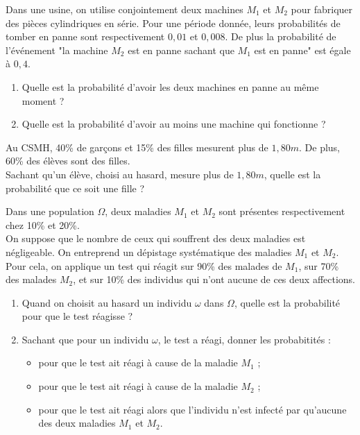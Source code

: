 \documentclass[11pt]{article}
\begin{document}
\begin{exercice}
Dans une usine, on utilise conjointement deux machines $M_1$ et $M_2$ pour
fabriquer des pièces cylindriques en série. Pour une période donnée,
leurs probabilités de tomber en panne sont respectivement $0,01$ et
$0,008$. De plus la probabilité de l’événement "la machine $M_2$ est en
panne sachant que $M_1$ est en panne" est égale à $0,4$.
\begin{enumerate}
\item Quelle est la probabilité d’avoir les deux machines en panne
  au même moment ? 
\item Quelle est la probabilité d’avoir au moins
  une machine qui fonctionne ?
\end{enumerate}
\end{exercice}

\begin{exercice}
Au CSMH, 40\% de garçons et 15\% des filles mesurent plus de
$1,80m$. De plus, 60\% des élèves sont des filles. \\
Sachant qu’un élève, choisi au hasard, mesure plus de $1,80m$, quelle
est la probabilité que ce soit une fille ? 
\end{exercice}

\begin{exercice}
Dans une population $\Omega$, deux maladies $M_1$ et $M_2$ sont
présentes respectivement chez 10\% et 20\%. \\
On suppose que le nombre de ceux qui souffrent des deux maladies est
négligeable. On entreprend un dépistage systématique des maladies
$M_1$ et $M_2$.\\
 Pour cela, on applique un test qui réagit sur 90\% des malades de
 $M_1$, sur 70\% des malades $M_2$, et sur 10\% des individus qui
 n’ont aucune de ces deux affections.
 \begin{enumerate}
 \item Quand on choisit au hasard un individu $\omega$ dans $\Omega$, quelle est
   la probabilité pour que le test réagisse ? 
 \item Sachant que pour un
   individu $\omega$, le test a réagi, donner les probabitités : 
   \begin{itemize}
   \item pour que le test ait réagi à cause de la maladie $M_1$ ;
   \item pour que le test ait réagi à cause de la maladie $M_2$ ; 
   \item pour que le test ait réagi alors que l’individu n’est infecté par
     qu’aucune des deux maladies $M_1$ et $M_2$.
   \end{itemize}
 \end{enumerate}
\end{exercice}
\end{document}
